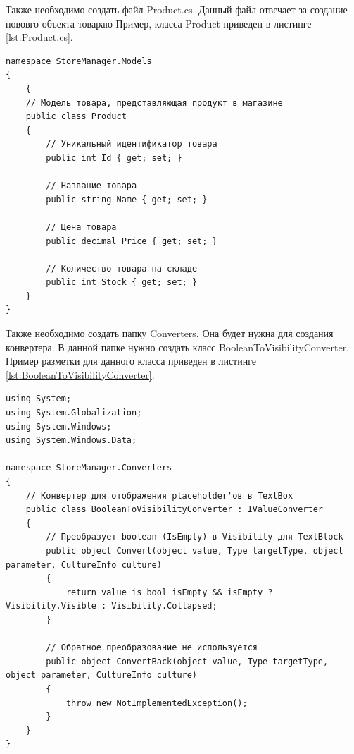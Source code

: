 \documentclass[12pt]{article}
\newcommand{\colorGIT}[1]{\textcolor{CtpGreen}{#1}}
\begin{document}
Также необходимо создать файл Product.cs. Данный файл отвечает за создание нововго объекта товараю Пример, класса Product приведен в листинге \ref{lst:Product.cs}.

\newpage

\begin{lstlisting}[style=csharp_catppuccin, caption=Класс \colorGIT{\href{https://github.com/WebMasterIT/Csharp_Labs/blob/ec375afd16c0647b337cf3d8a79c8bef904fc1be/3lab/StoreManager/Models/Product.cs\#L1-L18}{Product.cs}}, label=lst:Product.cs]
namespace StoreManager.Models
{
    {
    // Модель товара, представляющая продукт в магазине
    public class Product
    {
        // Уникальный идентификатор товара
        public int Id { get; set; }

        // Название товара
        public string Name { get; set; }

        // Цена товара
        public decimal Price { get; set; }

        // Количество товара на складе
        public int Stock { get; set; }
    }
}   
\end{lstlisting}


Также необходимо создать папку Converters. Она будет нужна для создания конвертера. В данной папке нужно создать класс BooleanToVisibilityConverter. Пример разметки для данного класса приведен в листинге \ref{lst:BooleanToVisibilityConverter}.
\begin{lstlisting}[style=csharp_catppuccin, caption=Класс \colorGIT{\href{https://github.com/WebMasterIT/Csharp_Labs/blob/ec375afd16c0647b337cf3d8a79c8bef904fc1be/3lab/StoreManager/Converters/BooleanToVisibilityConverter.cs\#L1-L23}{BooleanToVisibilityConverter}}, label=lst:BooleanToVisibilityConverter]
using System;
using System.Globalization;
using System.Windows;
using System.Windows.Data;

namespace StoreManager.Converters
{
    // Конвертер для отображения placeholder'ов в TextBox
    public class BooleanToVisibilityConverter : IValueConverter
    {
        // Преобразует boolean (IsEmpty) в Visibility для TextBlock
        public object Convert(object value, Type targetType, object parameter, CultureInfo culture)
        {
            return value is bool isEmpty && isEmpty ? Visibility.Visible : Visibility.Collapsed;
        }

        // Обратное преобразование не используется
        public object ConvertBack(object value, Type targetType, object parameter, CultureInfo culture)
        {
            throw new NotImplementedException();
        }
    }
}
\end{lstlisting}
\end{document}
